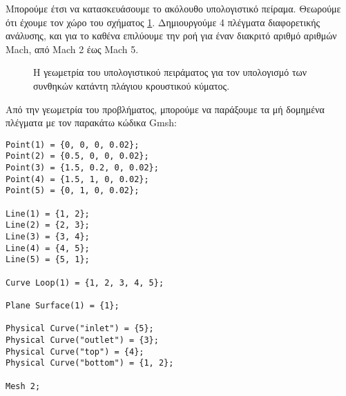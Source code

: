 Μπορούμε έτσι να κατασκευάσουμε το ακόλουθο υπολογιστικό πείραμα.
Θεωρούμε ότι έχουμε τον χώρο του σχήματος \ref{fig:wedge-geometry}.
Δημιουργούμε 4 πλέγματα διαφορετικής ανάλυσης, και για το καθένα επιλύουμε την ροή για έναν διακριτό αριθμό αριθμών Mach, από Mach 2 έως Mach 5.

\begin{figure}[H]
    \centering
    \caption{Η γεωμετρία του υπολογιστικού πειράματος για τον υπολογισμό των συνθηκών κατάντη πλάγιου κρουστικού κύματος.}
    \label{fig:wedge-geometry}
\end{figure}

Από την γεωμετρία του προβλήματος, μπορούμε να παράξουμε τα μή δομημένα πλέγματα με τον παρακάτω κώδικα Gmsh:

\begin{samepage}
\begin{lstlisting}[style=jlcodestyle]
Point(1) = {0, 0, 0, 0.02};
Point(2) = {0.5, 0, 0, 0.02};
Point(3) = {1.5, 0.2, 0, 0.02};
Point(4) = {1.5, 1, 0, 0.02};
Point(5) = {0, 1, 0, 0.02};

Line(1) = {1, 2};
Line(2) = {2, 3};
Line(3) = {3, 4};
Line(4) = {4, 5};
Line(5) = {5, 1};

Curve Loop(1) = {1, 2, 3, 4, 5};

Plane Surface(1) = {1};

Physical Curve("inlet") = {5};
Physical Curve("outlet") = {3};
Physical Curve("top") = {4};
Physical Curve("bottom") = {1, 2};

Mesh 2;
\end{lstlisting}
\end{samepage}


